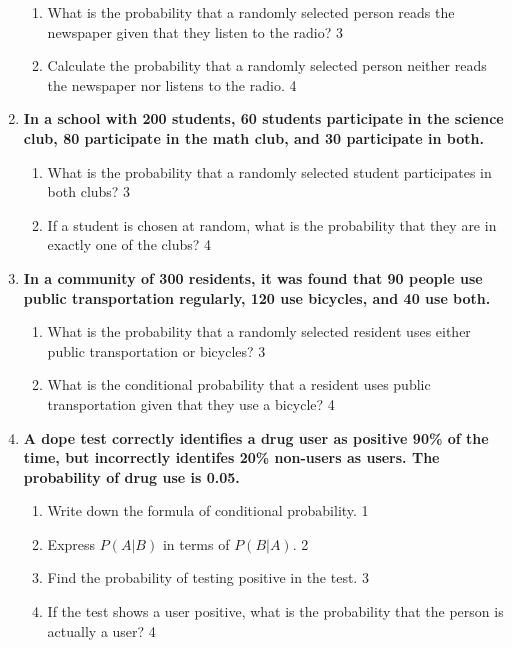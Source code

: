 \documentclass[a4paper,oneside, margin=1.4in]{book}
\begin{document}
\begin{enumerate}
  \begin{enumerate}
    \item
    	What is the probability that a randomly selected person reads the newspaper given that they listen to the radio? \hfill 3
    \item
    	Calculate the probability that a randomly selected person neither reads the newspaper nor listens to the radio. \hfill 4
  \end{enumerate}

\item
  \textbf{In a school with 200 students, 60 students participate in the science club, 80 participate in the math club, and 30 participate in both.}
 
  \begin{enumerate}
    \item
    	What is the probability that a randomly selected student participates in both clubs? \hfill 3
    \item
    	If a student is chosen at random, what is the probability that they are in exactly one of the clubs? \hfill 4
  \end{enumerate}

\item
  \textbf{In a community of 300 residents, it was found that 90 people use public transportation regularly, 120 use bicycles, and 40 use both.}
 
  \begin{enumerate}
    \item
    	What is the probability that a randomly selected resident uses either public transportation or bicycles? \hfill 3
    \item
    	What is the conditional probability that a resident uses public transportation given that they use a bicycle? \hfill 4
  \end{enumerate}

  
  \item
	  \textbf{A dope test correctly identifies a drug user as positive 90\%  of the time, but incorrectly identifes 20\% non-users as users. The probability of drug use is 0.05.} 
  
  \begin{enumerate}
    \item
	Write down the formula of conditional probability. \hfill 1
    \item
	Express $P(A|B)$ in terms of $P(B|A)$. \hfill 2
    \item  
	Find the probability of testing positive in the test. \hfill 3
    \item
	If the test shows a user positive, what is the probability that the person is actually a user? \hfill 4
  \end{enumerate}


\end{enumerate}
\end{document}
